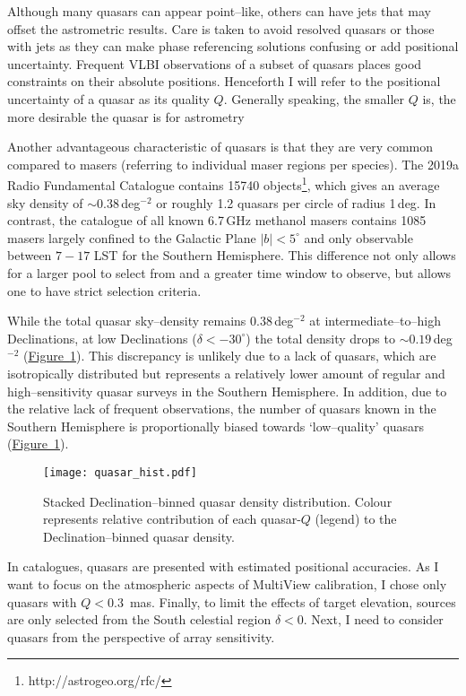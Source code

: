     	Although many quasars can appear point--like, others can have jets that may offset the astrometric results. Care is taken to avoid resolved quasars or those with jets as they can make phase referencing solutions confusing or add positional uncertainty. Frequent VLBI observations of a subset of quasars places good constraints on their absolute positions. Henceforth I will refer to the positional uncertainty of a quasar as its quality $Q$. Generally speaking, the smaller $Q$ is, the more desirable the quasar is for astrometry
    	
    	Another advantageous characteristic of quasars is that they are very common compared to masers (referring to individual maser regions per species). The 2019a Radio Fundamental Catalogue contains 15740 objects\footnote{http://astrogeo.org/rfc/}, which gives an average sky density of $\sim0.38$\,deg$^{-2}$ or roughly 1.2 quasars per circle of radius 1\,deg. In contrast, the catalogue of all known 6.7\,GHz methanol masers \citep[][ and referenced therin]{Yang2019} contains 1085 masers largely confined to the Galactic Plane $|b|<5^\circ$ and only observable between $7-17$ LST for the Southern Hemisphere. This difference not only allows for a larger pool to select from and a greater time window to observe, but allows one to have strict selection criteria. 
    	
    	While the total quasar sky--density remains $0.38$\,deg$^{-2}$ at intermediate--to--high Declinations, at low Declinations ($\delta < -30^{\circ}$) the total density drops to $\sim0.19$\,deg$^{-2}$ (\hyperref[quasarrainbow_hist]{Figure~\ref*{quasarrainbow_hist}}). This discrepancy is unlikely due to a lack of quasars, which are isotropically distributed but represents a relatively lower amount of regular and high--sensitivity quasar surveys in the Southern Hemisphere. In addition, due to the relative lack of frequent observations, the number of quasars known in the Southern Hemisphere is proportionally biased towards `low--quality' quasars (\hyperref[quasarrainbow_hist]{Figure~\ref*{quasarrainbow_hist}}).
    	\begin{figure}[h]
    		\centering
    		\texttt{[image: quasar\_hist.pdf]} 
    		\caption[Quasar Quality Histogram]{Stacked Declination--binned quasar density distribution. Colour represents relative contribution of each quasar-$Q$ (legend) to the Declination--binned quasar density.}
    		\label{quasarrainbow_hist}
    	\end{figure}
    	In catalogues, quasars are presented with estimated positional accuracies. As I want to focus on the atmospheric aspects of MultiView calibration, I chose only quasars with $Q<0.3$~mas.  Finally, to limit the effects of target elevation, sources are only selected from the South celestial region $\delta<0$. Next, I need to consider quasars from the perspective of array sensitivity. 
